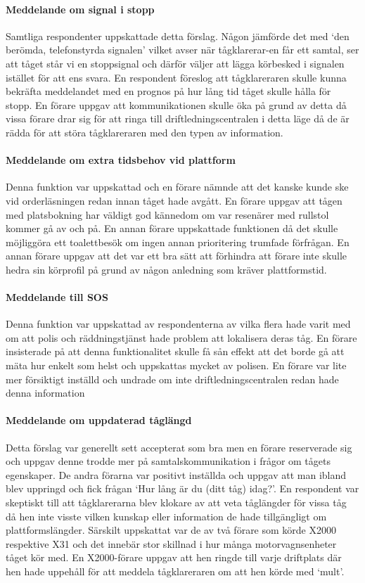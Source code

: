 \paragraph{Meddelande om signal i stopp}
Samtliga respondenter uppskattade detta förslag.
Någon jämförde det med \lq{}den berömda, telefonstyrda signalen\rq{} vilket avser när tågklarerar-en får ett samtal, ser att tåget står vi en stoppsignal och därför väljer att lägga körbesked i signalen istället för att ens svara.
En respondent föreslog att tågklareraren skulle kunna bekräfta meddelandet med en prognos på hur lång tid tåget skulle hålla för stopp.
En förare uppgav att kommunikationen skulle öka på grund av detta då vissa förare drar sig för att ringa till driftledningscentralen i detta läge då de är rädda för att störa tågklareraren med den typen av information.
\paragraph{Meddelande om extra tidsbehov vid plattform}
Denna funktion var uppskattad och en förare nämnde att det kanske kunde ske vid orderläsningen redan innan tåget hade avgått.
En förare uppgav att tågen med platsbokning har väldigt god kännedom om var resenärer med rullstol kommer gå av och på.
En annan förare uppskattade funktionen då det skulle möjliggöra ett toalettbesök om ingen annan prioritering trumfade förfrågan.
En annan förare uppgav att det var ett bra sätt att förhindra att förare inte skulle hedra sin körprofil på grund av någon anledning som kräver plattformstid.
\paragraph{Meddelande till SOS}
Denna funktion var uppskattad av respondenterna av vilka flera hade varit med om att polis och räddningstjänst hade problem att lokalisera deras tåg.
En förare insisterade på att denna funktionalitet skulle få sån effekt att det borde gå att mäta hur enkelt som helst och uppskattas mycket av polisen.
En förare var lite mer försiktigt inställd och undrade om inte driftledningscentralen redan hade denna information
\paragraph{Meddelande om uppdaterad tåglängd}
Detta förslag var generellt sett accepterat som bra men en förare reserverade sig och uppgav denne trodde mer på samtalskommunikation i frågor om tågets egenskaper.
De andra förarna var positivt inställda och uppgav att man ibland blev uppringd och fick frågan \lq{}Hur lång är du (ditt tåg) idag?\rq{}.
En respondent var skeptiskt till att tågklarerarna blev klokare av att veta tåglängder för vissa tåg då hen inte visste vilken kunskap eller information de hade tillgängligt om plattformslängder.
Särskilt uppskattat var de av två förare som körde X2000 respektive X31 och det innebär stor skillnad i hur många motorvagnsenheter tåget kör med.
En X2000-förare uppgav att hen ringde till varje driftplats där hen hade uppehåll för att meddela tågklareraren om att hen körde med \lq{}mult\rq{}.
